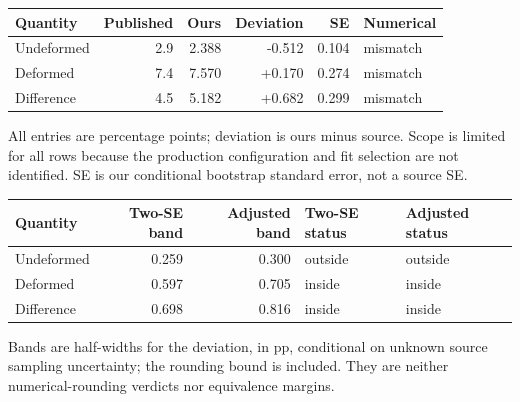 \begin{center}
\begin{tabular}{p{.21\linewidth}rrrrp{.13\linewidth}}
\toprule Quantity & Published & Ours & Deviation & SE & Numerical\\\midrule
Undeformed & 2.9 & 2.388 & -0.512 & 0.104 & mismatch\\
Deformed & 7.4 & 7.570 & +0.170 & 0.274 & mismatch\\
Difference & 4.5 & 5.182 & +0.682 & 0.299 & mismatch\\
\bottomrule\end{tabular}
\end{center}
All entries are percentage points; deviation is ours minus source. Scope is limited for all rows because the production configuration and fit selection are not identified. SE is our conditional bootstrap standard error, not a source SE.
\begin{center}\begin{tabular}{lrrll}
\toprule Quantity & Two-SE band & Adjusted band & Two-SE status & Adjusted status\\\midrule
Undeformed & 0.259 & 0.300 & outside & outside\\
Deformed & 0.597 & 0.705 & inside & inside\\
Difference & 0.698 & 0.816 & inside & inside\\
\bottomrule\end{tabular}\end{center}
Bands are half-widths for the deviation, in pp, conditional on unknown source sampling uncertainty; the rounding bound is included. They are neither numerical-rounding verdicts nor equivalence margins.
